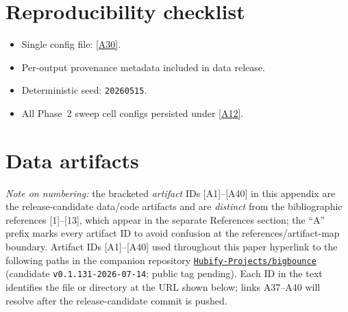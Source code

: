 \documentclass[aps,prd,twocolumn,superscriptaddress,showpacs,preprintnumbers,nofootinbib,longbibliography,floatfix]{revtex4-2}
\newcommand{\repoBase}{https://github.com/Hubify-Projects/bigbounce/blob/main}
\newcommand{\paperVersion}{v0.1.131-2026-07-14}
\begin{document}
\section*{Reproducibility checklist}
\begin{itemize}
\item Single config file:
\href{\repoBase/pipelines/p5\_desi\_chirality/env\_finder/config.yaml}{[A30]}.
\item Per-output provenance metadata included in data release.
\item Deterministic seed: \texttt{20260515}.
\item All Phase~2 sweep cell configs persisted under
\href{\repoBase/pipelines/p5\_desi\_chirality/data/desi\_env/phase2\_sweep}{[A12]}.
\end{itemize}

\section{Data artifacts}\label{app:artifacts}

\emph{Note on numbering:} the bracketed \emph{artifact} IDs
[A1]--[A40] in this appendix are the release-candidate data/code
artifacts and are \emph{distinct} from the bibliographic references
[1]--[13], which appear in the separate References section; the ``A''
prefix marks every artifact ID to avoid confusion at the
references/artifact-map boundary. Artifact IDs [A1]--[A40] used
throughout this paper hyperlink to the following paths in the companion
repository
\href{https://github.com/Hubify-Projects/bigbounce}{\texttt{Hubify-Projects/bigbounce}}
(candidate \texttt{\paperVersion}; public tag pending). Each ID in the
text identifies the file or directory at the URL shown below; links A37--A40
will resolve after the release-candidate commit is pushed.
\end{document}

